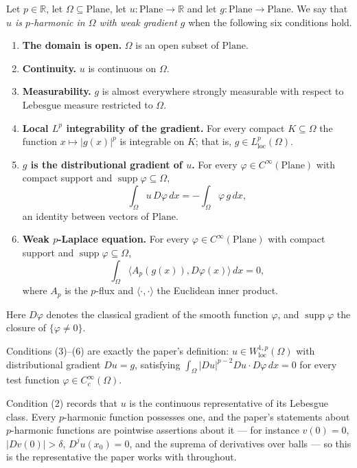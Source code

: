 \begin{definition}
Let $p\in\mathbb{R}$, let $\Omega\subseteq\mathrm{Plane}$, let $u\colon\mathrm{Plane}\to\mathbb{R}$
and let $g\colon\mathrm{Plane}\to\mathrm{Plane}$.  We say that \emph{$u$ is $p$-harmonic in
$\Omega$ with weak gradient $g$} when the following six conditions hold.
\begin{enumerate}
\item \textbf{The domain is open.} $\Omega$ is an open subset of $\mathrm{Plane}$.
\item \textbf{Continuity.} $u$ is continuous on $\Omega$.
\item \textbf{Measurability.} $g$ is almost everywhere strongly measurable with respect to
Lebesgue measure restricted to $\Omega$.
\item \textbf{Local $L^p$ integrability of the gradient.} For every compact
$K\subseteq\Omega$ the function $x\mapsto\lvert g(x)\rvert^{p}$ is integrable on $K$; that is,
$g\in L^p_{\mathrm{loc}}(\Omega)$.
\item \textbf{$g$ is the distributional gradient of $u$.} For every
$\varphi\in C^\infty(\mathrm{Plane})$ with compact support and
$\operatorname{supp}\varphi\subseteq\Omega$,
\[
  \int_\Omega u\,D\varphi\,dx = -\int_\Omega \varphi\,g\,dx ,
\]
an identity between vectors of $\mathrm{Plane}$.
\item \textbf{Weak $p$-Laplace equation.} For every
$\varphi\in C^\infty(\mathrm{Plane})$ with compact support and
$\operatorname{supp}\varphi\subseteq\Omega$,
\[
  \int_\Omega \bigl\langle A_p(g(x)),D\varphi(x)\bigr\rangle\,dx = 0 ,
\]
where $A_p$ is the $p$-flux and $\langle\cdot,\cdot\rangle$ the Euclidean inner product.
\end{enumerate}
Here $D\varphi$ denotes the classical gradient of the smooth function $\varphi$, and
$\operatorname{supp}\varphi$ the closure of $\{\varphi\neq0\}$.

Conditions (3)--(6) are exactly the paper's definition: $u\in W^{1,p}_{\mathrm{loc}}(\Omega)$
with distributional gradient $Du=g$, satisfying
$\int_\Omega\lvert Du\rvert^{p-2}Du\cdot D\varphi\,dx=0$ for every test function
$\varphi\in C^\infty_c(\Omega)$.

Condition (2) records that $u$ is the continuous representative of its Lebesgue class.  Every
$p$-harmonic function possesses one, and the paper's statements about $p$-harmonic functions
are pointwise assertions about it --- for instance $v(0)=0$, $\lvert Dv(0)\rvert>\delta$,
$D^ju(x_0)=0$, and the suprema of derivatives over balls --- so this is the representative the
paper works with throughout.


\end{definition}
